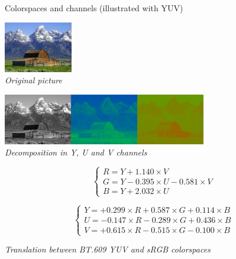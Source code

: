 \begin{frame}{Colorspaces and channels (illustrated with YUV)}
  \begin{minipage}[t]{0.25\textwidth}
    \centering
    \includegraphics[height=6em]{slides/graphics-introduction/barn.jpg}\\
    \textit{\small Original picture}
  \end{minipage}
  \hfill
  \begin{minipage}[t]{0.7\textwidth}
    \centering
    \includegraphics[height=6em]{slides/graphics-introduction/barn-yuv.jpg}\\
    \textit{\small Decomposition in Y, U and V channels}
  \end{minipage}

  \vspace{1em}

  \begin{minipage}[t]{0.4\textwidth}
    \small
    \begin{equation*}
    \begin{cases}
    R = Y + 1.140 \times V\\
    G = Y - 0.395 \times U - 0.581 \times V\\
    B = Y + 2.032 \times U
    \end{cases}
    \end{equation*}
  \end{minipage}
  \hfill
  \begin{minipage}[t]{0.55\textwidth}
    \small
    \begin{equation*}
    \begin{cases}
    Y = + 0.299 \times R + 0.587 \times G + 0.114 \times B\\
    U = - 0.147 \times R - 0.289 \times G + 0.436 \times B\\
    V = + 0.615 \times R - 0.515 \times G - 0.100 \times B
    \end{cases}
    \end{equation*}
  \end{minipage}

  \begin{center}
     \textit{\small Translation between BT.609 YUV and sRGB colorspaces}
  \end{center}
\end{frame}

